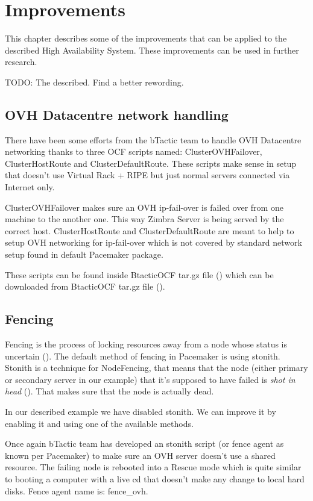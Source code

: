 

\chapter{Improvements}
\label{chap:improvements}
This chapter describes some of the improvements that can be applied to the described High Availability System. These improvements can be used in further research.

TODO: The described. Find a better rewording.

\section {OVH Datacentre network handling}
There have been some efforts from the bTactic team to handle OVH Datacentre networking thanks to three OCF scripts named: 
ClusterOVHFailover, ClusterHostRoute and ClusterDefaultRoute. These scripts make sense in setup that doesn't use Virtual Rack + RIPE but just normal servers connected via Internet only.

ClusterOVHFailover makes sure an OVH ip-fail-over is failed over from one machine to the another one. This way Zimbra Server is being served by the correct host.
ClusterHostRoute and ClusterDefaultRoute are meant to help to setup OVH networking for ip-fail-over which is not covered by standard network setup found in  default Pacemaker package.

These scripts can be found inside BtacticOCF tar.gz file (\cite{BtacticOCF}) which can be downloaded from BtacticOCF  tar.gz file (\cite{BtacticOrg}).

\section {Fencing}
Fencing is the process of locking resources away from a node whose status is uncertain (\cite{LinuxHAFencing}). The default method of fencing in Pacemaker is using stonith. Stonith is a technique for NodeFencing, that means that the node (either primary or secondary server in our example) that it's supposed to have failed is \textit{shot in head} (\cite{LinuxHAStonith}). That makes sure that the node is actually dead.

In our described example we have disabled stonith. We can improve it by enabling it and using one of the available methods.

Once again bTactic team has developed an stonith script (or fence agent as known per Pacemaker) to make sure an OVH server doesn't use a shared resource. The failing node is rebooted into a Rescue mode which is quite similar to booting a computer with a live cd that doesn't make any change to local hard disks. Fence agent name is: fence\_ovh.

